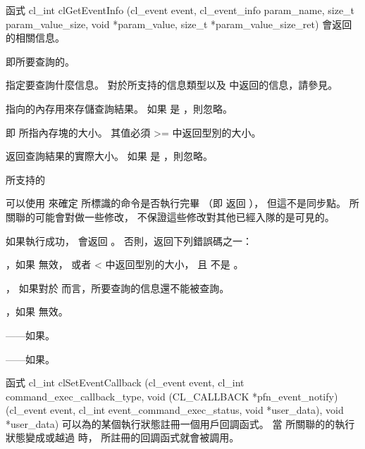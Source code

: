 函式
\startclc
cl_int clGetEventInfo (cl_event event,
			cl_event_info param_name,
			size_t param_value_size,
			void *param_value,
			size_t *param_value_size_ret)
\stopclc
會返回的相關信息。

 即所要查詢的。

 指定要查詢什麼信息。
對於所支持的信息類型以及  中返回的信息，請參見。

 指向的內存用來存儲查詢結果。
如果  是 ，則忽略。

 即  所指內存塊的大小。
其值必須 >= 中返回型別的大小。

 返回查詢結果的實際大小。
如果  是 ，則忽略。

\startbuffer[tblclgeteventinfo]
 所支持的 
\stopbuffer
{}

可以使用  來確定  所標識的命令是否執行完畢
（即  返回 ），
但這不是同步點。
  所關聯的可能會對做一些修改，
不保證這些修改對其他已經入隊的是可見的。

如果執行成功，  會返回 。
否則，返回下列錯誤碼之一：
\startigBase
\item {}，如果  無效，
或者  < 中返回型別的大小，
且  不是 。

\item {}，
如果對於  而言，所要查詢的信息還不能被查詢。

\item {}，如果  無效。

\item {}——如果\scdevfailres。

\item {}——如果\schostfailres。
\stopigBase

函式
\startclc
cl_int clSetEventCallback (cl_event event,
			cl_int command_exec_callback_type,
			void (CL_CALLBACK *pfn_event_notify)(cl_event event,
					cl_int event_command_exec_status,
					void *user_data),
			void *user_data)
\stopclc
可以為的某個執行狀態註冊一個用戶回調函式。
當  所關聯的的執行狀態變成或越過  時，
所註冊的回調函式就會被調用。

